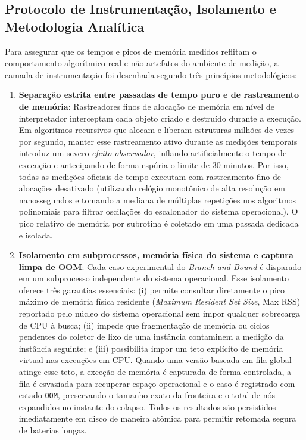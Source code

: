 \subsection{Protocolo de Instrumentação, Isolamento e Metodologia Analítica}
\label{sec:instrumentacao}

Para assegurar que os tempos e picos de memória medidos reflitam o comportamento algorítmico
real e não artefatos do ambiente de medição, a camada de instrumentação foi desenhada segundo
três princípios metodológicos:

\begin{enumerate}
  \item \textbf{Separação estrita entre passadas de tempo puro e de rastreamento de memória}:
  Rastreadores finos de alocação de memória em nível de interpretador interceptam cada objeto
  criado e destruído durante a execução. Em algoritmos recursivos que alocam e liberam
  estruturas milhões de vezes por segundo, manter esse rastreamento ativo durante as medições
  temporais introduz um severo \emph{efeito observador}, inflando artificialmente o tempo de
  execução e antecipando de forma espúria o limite de 30 minutos. Por isso, todas as medições
  oficiais de tempo executam com rastreamento fino de alocações desativado (utilizando relógio
  monotônico de alta resolução em nanossegundos e tomando a mediana de múltiplas repetições nos
  algoritmos polinomiais para filtrar oscilações do escalonador do sistema operacional). O pico
  relativo de memória por subrotina é coletado em uma passada dedicada e isolada.

  \item \textbf{Isolamento em subprocessos, memória física do sistema e captura limpa de OOM}:
  Cada caso experimental do \textit{Branch-and-Bound} é disparado em um subprocesso
  independente do sistema operacional. Esse isolamento oferece três garantias essenciais:
  (i) permite consultar diretamente o pico máximo de memória física residente (\textit{Maximum
  Resident Set Size}, Max RSS) reportado pelo núcleo do sistema operacional sem impor qualquer
  sobrecarga de CPU à busca; (ii) impede que fragmentação de memória ou ciclos pendentes do
  coletor de lixo de uma instância contaminem a medição da instância seguinte; e (iii) possibilita
  impor um teto explícito de memória virtual nas execuções em CPU. Quando uma versão baseada em
  fila global atinge esse teto, a exceção de memória é capturada de forma controlada, a fila é
  esvaziada para recuperar espaço operacional e o caso é registrado com estado \texttt{OOM},
  preservando o tamanho exato da fronteira e o total de nós expandidos no instante do colapso.
  Todos os resultados são persistidos imediatamente em disco de maneira atômica para permitir
  retomada segura de baterias longas.


\end{enumerate}
